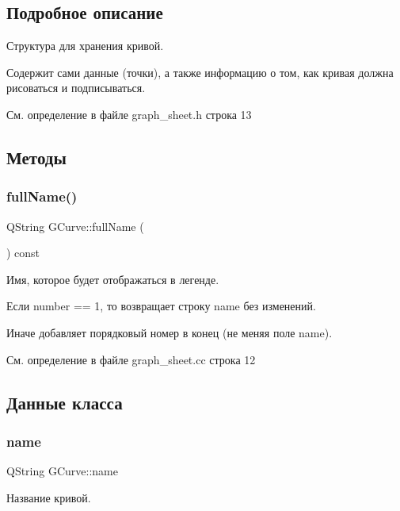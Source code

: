\subsection{Подробное описание}
Структура для хранения кривой. 

Содержит сами данные (точки), а также информацию о том, как кривая должна рисоваться и подписываться. 

См. определение в файле graph\+\_\+sheet.\+h строка 13



\subsection{Методы}
\hypertarget{struct_g_curve_ad9ab2e3ed72e50aaf536db8b961987cc}{}\label{struct_g_curve_ad9ab2e3ed72e50aaf536db8b961987cc} 
\subsubsection{\texorpdfstring{full\+Name()}{fullName()}}
{\footnotesize\ttfamily Q\+String G\+Curve\+::full\+Name (\begin{DoxyParamCaption}{ }\end{DoxyParamCaption}) const}



Имя, которое будет отображаться в легенде. 

Если number == 1, то возвращает строку name без изменений.

Иначе добавляет порядковый номер в конец (не меняя поле name). 

См. определение в файле graph\+\_\+sheet.\+cc строка 12



\subsection{Данные класса}
\hypertarget{struct_g_curve_a39cc624ec8dffac8afb249e9c6861b88}{}\label{struct_g_curve_a39cc624ec8dffac8afb249e9c6861b88} 
\subsubsection{\texorpdfstring{name}{name}}
{\footnotesize\ttfamily Q\+String G\+Curve\+::name}

Название кривой. 

